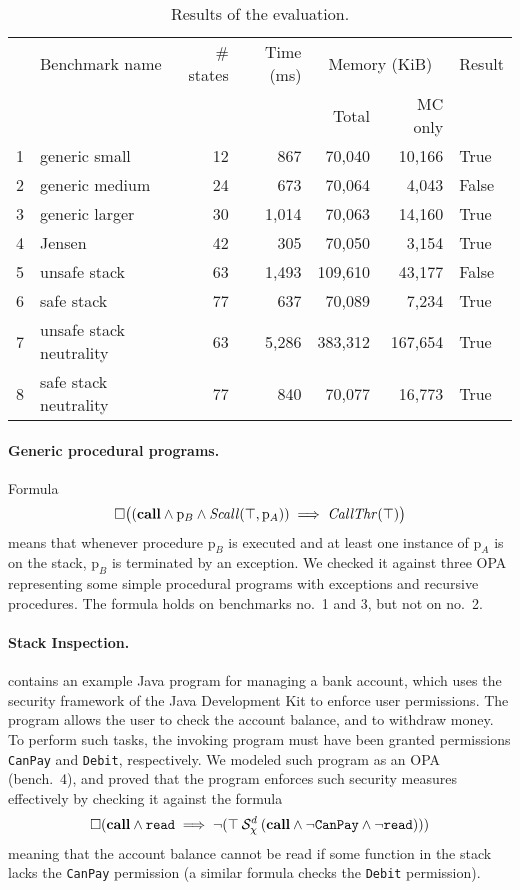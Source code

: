 \documentclass[9pt,a4paper]{article}
\begin{document}
\begin{table}
  \centering
  \begin{tabular}{| r | l | r | r | r | r | l |}
    \hline
    & Benchmark name & \# states & Time (ms) & \multicolumn{2}{c|}{Memory (KiB)} & Result \\
    \cline{5-6}
    & & & & Total & MC only & \\
    \hline
    1 & generic small & 12 & 867 & 70,040 & 10,166 & True \\
    2 & generic medium & 24 & 673 & 70,064 & 4,043 & False \\
    3 & generic larger & 30 & 1,014 & 70,063 & 14,160 & True \\
    4 & Jensen & 42 & 305 & 70,050 & 3,154 & True \\
    5 & unsafe stack & 63 & 1,493 & 109,610 & 43,177 & False \\
    6 & safe stack & 77 & 637 & 70,089 & 7,234 & True \\
    7 & unsafe stack neutrality & 63 & 5,286 & 383,312 & 167,654 & True \\
    8 & safe stack neutrality & 77 & 840 & 70,077 & 16,773 & True \\
    \hline
  \end{tabular}
  \caption{Results of the evaluation.}
  \label{tab:eval}
\end{table}

\paragraph{Generic procedural programs.}
Formula
\[
  \square \big((\mathbf{call} \land \mathrm{p}_B \land
    \mathit{Scall}(\top, \mathrm{p}_A))
    \implies \mathit{CallThr}(\top) \big)
\]
means that whenever procedure $\mathrm{p}_B$ is executed and at least
one instance of $\mathrm{p}_A$ is on the stack, $\mathrm{p}_B$ is
terminated by an exception.  We checked it against three OPA
representing some simple procedural programs with exceptions and
recursive procedures.  The formula holds on benchmarks no.\ 1 and 3,
but not on no.\ 2.

\paragraph{Stack Inspection.}
\cite{JensenLT99} contains an example Java program for managing a bank
account, which uses the security framework of the Java Development Kit
to enforce user permissions. The program allows the user to check the
account balance, and to withdraw money. To perform such tasks, the
invoking program must have been granted permissions \texttt{CanPay}
and \texttt{Debit}, respectively.  We modeled such program as an OPA
(bench.\ 4), and proved that the program enforces such security
measures effectively by checking it against the formula
\[
\square (\mathbf{call} \land \mathtt{read} \implies
  \neg ({\top} \mathbin{\mathcal{S}_\chi^d} {(\mathbf{call} \land
                         \neg \mathtt{CanPay}
                         \land \neg \mathtt{read})}))
\]
meaning that the account balance cannot be read if some function in
the stack lacks the \texttt{CanPay} permission (a similar formula
checks the \texttt{Debit} permission).
\end{document}
